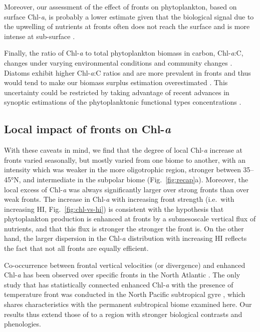 Moreover, our assessment of the effect of fronts on phytoplankton, based on surface Chl\nobreakdash-\emph{a}, is probably a lower estimate given that the biological signal due to the upwelling of nutrients at fronts often does not reach the surface and is more intense at sub-surface \citep{mourino_2004, ruiz_2019}.

Finally, the ratio of Chl\nobreakdash-\emph{a} to total phytoplankton biomass in carbon, Chl\nobreakdash-\emph{a}:C, changes under varying environmental conditions and community changes \citep{behrenfeld_2015, halsey_2015, inomura_2022}.
Diatoms exhibit higher Chl\nobreakdash-\emph{a}:C ratios and are more prevalent in fronts and thus would tend to make our biomass surplus estimation overestimated \citep{treguer_2018}.
This uncertainty could be restricted by taking advantage of recent advances in synoptic estimations of the phytoplanktonic functional types concentrations \citep{elhourany_2019}.

\subsection{Local impact of fronts on Chl\nobreakdash-\emph{a}}

With these caveats in mind, we find that the degree of local Chl\nobreakdash-\emph{a} increase at fronts varied seasonally, but mostly varied from one biome to another, with an intensity which was weaker in the more oligotrophic region, stronger between 35--45°N, and intermediate in the subpolar biome (Fig.~\ref{fig:recap}a).
Moreover, the local excess of Chl\nobreakdash-\emph{a} was always significantly larger over strong fronts than over weak fronts.
The increase in Chl\nobreakdash-\emph{a} with increasing front strength (i.e.\ with increasing HI, Fig.~\ref{fig:chl-vs-hi}) is consistent with the hypothesis that phytoplankton production is enhanced at fronts by a submesoscale vertical flux of nutrients, and that this flux is stronger the stronger the front is.
On the other hand, the larger dispersion in the Chl\nobreakdash-\emph{a} distribution with increasing HI reflects the fact that not all fronts are equally efficient.

Co-occurrence between frontal vertical velocities (or divergence) and enhanced Chl\nobreakdash-\emph{a} has been observed over specific fronts in the North Atlantic \citep{mourino_2004, allen_2005, lehahn_2007}.
The only study that has statistically connected enhanced Chl\nobreakdash-\emph{a} with the presence of temperature front was conducted in the North Pacific subtropical gyre \citep{liu_2016}, which shares characteristics with the permanent subtropical biome examined here.
Our results thus extend those of \citet{liu_2016} to a region with stronger biological contrasts and phenologies.


